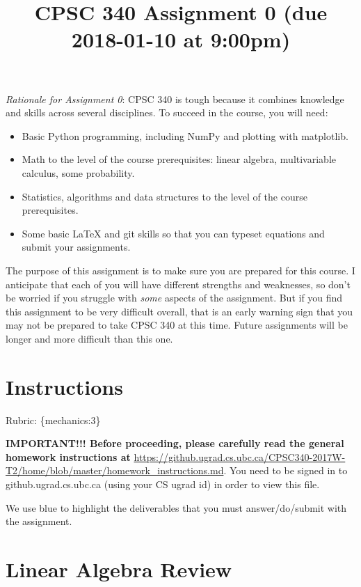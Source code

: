 \documentclass{article}
\def\rubric#1{\gre{Rubric: \{#1\}}}{}
\def\blu#1{{\color{blu}#1}}
\def\gre#1{{\color{gre}#1}}
\begin{document}
\title{CPSC 340 Assignment 0 (due 2018-01-10 at 9:00pm)}
\date{}
\maketitle

\vspace{-4em}

\emph{Rationale for Assignment 0}: CPSC 340 is tough because it combines knowledge and skills across several disciplines. To succeed
in the course, you will need:
\begin{itemize}
\item Basic Python programming, including NumPy and plotting with matplotlib.
\item Math to the level of the course prerequisites: linear algebra, multivariable calculus, some probability.
\item Statistics, algorithms and data structures to the level of the course prerequisites.
\item Some basic LaTeX and git skills so that you can typeset equations and submit your assignments.
\end{itemize}

The purpose of this assignment is to make sure you are prepared for this course. I anticipate that each
of you will have different strengths and weaknesses, so don't be worried if you struggle with \emph{some} aspects
of the assignment. But if you find this assignment
to be very difficult overall, that is an early warning sign that you may not be prepared to take CPSC 340
at this time. Future assignments will be longer and more difficult than this one.


\section*{Instructions}
\rubric{mechanics:3}

\textbf{IMPORTANT!!! Before proceeding, please carefully read the general homework instructions at} \url{https://github.ugrad.cs.ubc.ca/CPSC340-2017W-T2/home/blob/master/homework_instructions.md}.
You need to be signed in to github.ugrad.cs.ubc.ca (using your CS ugrad id) in order to view this file. 


\vspace{1em}
We use \blu{blue} to highlight the deliverables that you must answer/do/submit with the assignment.



\section{Linear Algebra Review}
\end{document}
